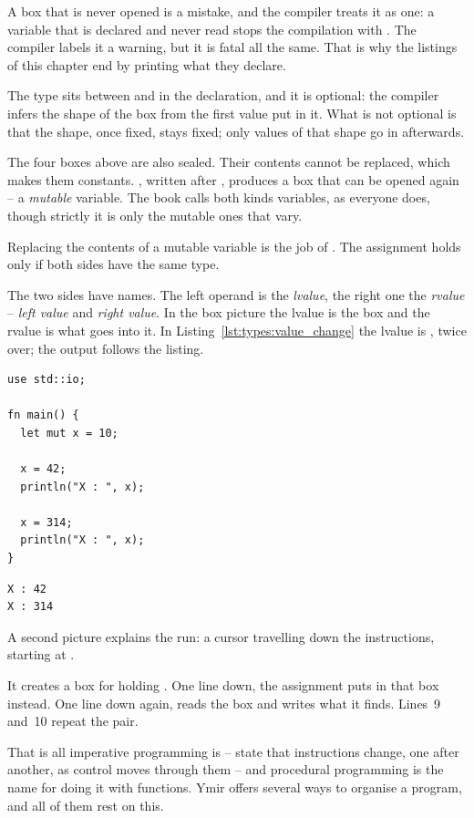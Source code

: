 A box that is never opened is a mistake, and the compiler treats it as one: a
variable that is declared and never read stops the compilation with
.
The compiler labels it a warning, but it is fatal all the same. That is why the listings of this
chapter end by printing what they declare.

The type sits between \token{:} and \token{=} in the declaration, and it is
optional: the compiler infers the shape of the box from the first value put in
it. What is not optional is that the shape, once fixed, stays fixed; only values
of that shape go in afterwards.

The four boxes above are also sealed. Their contents cannot be replaced, which
makes them constants. , written after , produces a box that
can be opened again -- a \textit{mutable} variable. The book calls both kinds
variables, as everyone does, though strictly it is only the mutable ones that
vary.



Replacing the contents of a mutable variable is the job of \token{=}. The
assignment holds only if both sides have the same type.

The two sides have names. The left operand is the \textit{lvalue}, the right one
the \textit{rvalue} -- \textit{left value} and \textit{right value}. In the box
picture the lvalue is the box and the rvalue is what goes into it. In
Listing~\ref{lst:types:value_change} the lvalue is , twice over; the
output follows the listing.

\begin{lstlisting}[style=coloredverbatim, caption=Example of mutable variable, label=lst:types:value_change]
use std::io;

fn main() {
  let mut x = 10;

  x = 42;
  println("X : ", x);

  x = 314;
  println("X : ", x);
}
\end{lstlisting}
\vspace{-10pt}%
\begin{lstlisting}[style=bashVerb, label=lst:types:value_change_output]
X : 42
X : 314
\end{lstlisting}

A second picture explains the run: a cursor travelling down the instructions,
starting at .

It creates a box for  holding . One line down, the assignment
puts  in that box instead. One line down again,  reads
the box and writes what it finds. Lines~9 and~10 repeat the pair.

That is all imperative programming is -- state that instructions change, one
after another, as control moves through them -- and procedural programming is the
name for doing it with functions. Ymir offers several ways to organise a program,
and all of them rest on this.
